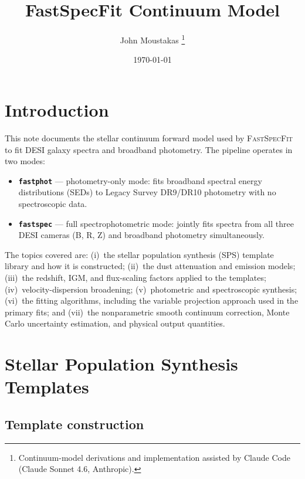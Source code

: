 \documentclass[12pt]{article}
\title{FastSpecFit Continuum Model}
\author{John Moustakas%
  \thanks{Continuum-model derivations and implementation assisted by
    Claude Code (Claude Sonnet 4.6, Anthropic).}}
\date{\today}
\begin{document}
\maketitle

\section{Introduction}

This note documents the stellar continuum forward model used by
\textsc{FastSpecFit} to fit DESI galaxy spectra and broadband photometry.
The pipeline operates in two modes:
\begin{itemize}
  \item \textbf{\texttt{fastphot}} — photometry-only mode: fits broadband
    spectral energy distributions (SEDs) to Legacy Survey DR9/DR10
    photometry with no spectroscopic data.
  \item \textbf{\texttt{fastspec}} — full spectrophotometric mode: jointly
    fits spectra from all three DESI cameras (B, R, Z) and broadband
    photometry simultaneously.
\end{itemize}

The topics covered are: (i)~the stellar population synthesis (SPS) template
library and how it is constructed; (ii)~the dust attenuation and emission
models; (iii)~the redshift, IGM, and flux-scaling factors applied to the
templates; (iv)~velocity-dispersion broadening; (v)~photometric and
spectroscopic synthesis; (vi)~the fitting algorithms, including the variable
projection approach used in the primary fits; and (vii)~the nonparametric
smooth continuum correction, Monte Carlo uncertainty estimation, and physical
output quantities.


\section{Stellar Population Synthesis Templates}
\label{sec:templates}

\subsection{Template construction}
\label{ssec:build}
\end{document}

